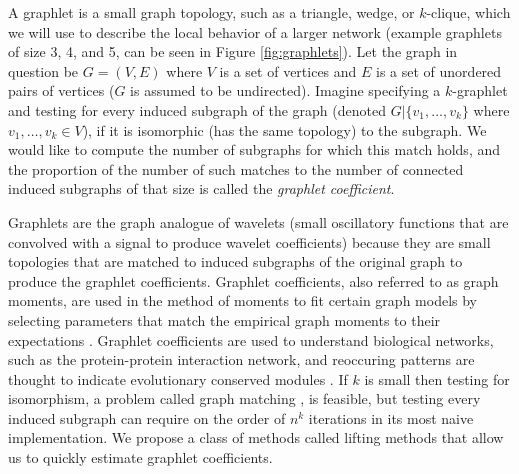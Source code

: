 	
	A graphlet is a small graph topology, such as a triangle, wedge, or $k$-clique, which we will use to describe the local behavior of a larger network (example graphlets of size 3, 4, and 5, can be seen in Figure \ref{fig:graphlets}).
	Let the graph in question be $G = (V,E)$ where $V$ is a set of vertices and $E$ is a set of unordered pairs of vertices ($G$ is assumed to be undirected).
	Imagine specifying a $k$-graphlet and testing for every induced subgraph of the graph (denoted $G|\{v_1,\ldots,v_k\}$ where $v_1,\ldots,v_k \in V$), if it is isomorphic (has the same topology) to the subgraph.
	We would like to compute the number of subgraphs for which this match holds, and the proportion of the number of such matches to the number of connected induced subgraphs of that size is called the {\em graphlet coefficient}.
	
    Graphlets are the graph analogue of wavelets (small oscillatory functions that are convolved with a signal to produce wavelet coefficients) because they are small topologies that are matched to induced subgraphs of the original graph to produce the graphlet coefficients.
	Graphlet coefficients, also referred to as graph moments, are used in the method of moments to fit certain graph models by selecting parameters that match the empirical graph moments to their expectations \cite{bickel2011method}.
	Graphlet coefficients are used to understand biological networks, such as the protein-protein interaction network, and reoccuring patterns are thought to indicate evolutionary conserved modules \cite{prvzulj2006efficient}. 
	If $k$ is small then testing for isomorphism, a problem called graph matching \cite{cordella2004sub}, is feasible, but testing every induced subgraph can require on the order of $n^k$ iterations in its most naive implementation.
	We propose a class of methods called lifting methods that allow us to quickly estimate graphlet coefficients.

	
